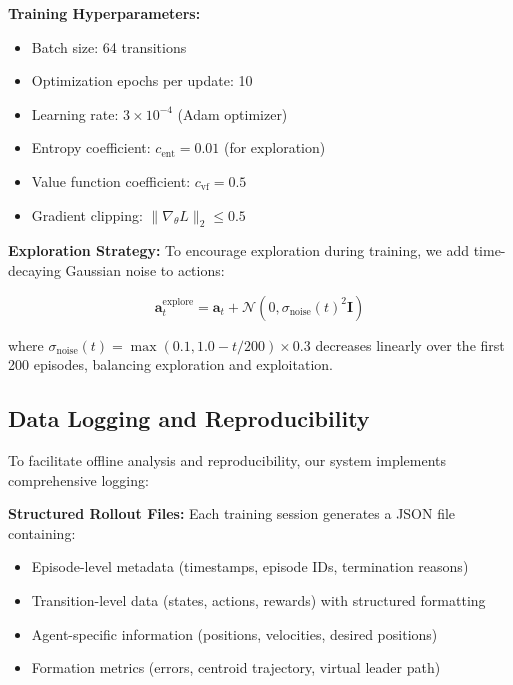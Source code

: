 \documentclass[preprint,3p]{elsarticle}
\begin{document}
\vspace{1em}

\textbf{Training Hyperparameters:}
\begin{itemize}
    \item Batch size: 64 transitions
    \item Optimization epochs per update: 10
    \item Learning rate: $3 \times 10^{-4}$ (Adam optimizer)
    \item Entropy coefficient: $c_{\text{ent}} = 0.01$ (for exploration)
    \item Value function coefficient: $c_{\text{vf}} = 0.5$
    \item Gradient clipping: $\|\nabla_\theta L\|_2 \leq 0.5$
\end{itemize}

\textbf{Exploration Strategy:} To encourage exploration during training, we add time-decaying Gaussian noise to actions:

\begin{equation}
    \mathbf{a}_t^{\text{explore}} = \mathbf{a}_t + \mathcal{N}(0, \sigma_{\text{noise}}(t)^2 \mathbf{I})
\end{equation}

where $\sigma_{\text{noise}}(t) = \max(0.1, 1.0 - t/200) \times 0.3$ decreases linearly over the first 200 episodes, balancing exploration and exploitation.

\subsection{Data Logging and Reproducibility}

To facilitate offline analysis and reproducibility, our system implements comprehensive logging:

\vspace{1em}

\textbf{Structured Rollout Files:} Each training session generates a JSON file containing:
\begin{itemize}
    \item Episode-level metadata (timestamps, episode IDs, termination reasons)
    \item Transition-level data (states, actions, rewards) with structured formatting
    \item Agent-specific information (positions, velocities, desired positions)
    \item Formation metrics (errors, centroid trajectory, virtual leader path)
\end{itemize}
\end{document}
